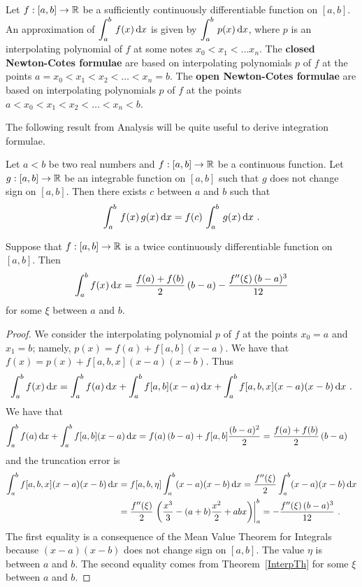 Let $f:[a,b]\rightarrow \mathbb{R}$ be a sufficiently continuously
differentiable function on $[a,b]$.  An approximation of
$\displaystyle \int_a^b\,f(x) \,\mathrm{d}x$ is given by
$\displaystyle \int_a^b\,p(x) \,\mathrm{d}x$,
where $p$ is an interpolating polynomial of $f$ at some notes
$x_0 < x_1 < \ldots x_n$.
The
{\bfseries closed Newton-Cotes formulae} are based on 
interpolating polynomials $p$ of $f$ at the points
$a=x_0 < x_1 <  x_2 < \ldots < x_n=b$.
The
{\bfseries open Newton-Cotes formulae} are based on 
interpolating polynomials $p$ of $f$ at the points
$a < x_0 < x_1 < x_2 < \ldots < x_n < b$.

The following result from Analysis will be quite useful to derive
integration formulae.

\begin{theorem} \label{Th4}
Let $a<b$ be two real numbers and $f:[a,b] \rightarrow \mathbb{R}$ be a
continuous function.  Let $g:[a,b] \rightarrow \mathbb{R}$ be an integrable
function on $[a,b]$ such that $g$ does not change sign on $[a,b]$.
Then there exists $c$ between $a$ and $b$ such that
\[
\int_a^b\,f(x)\,g(x) \,\mathrm{d}x=f(c)\,\int_a^b\,g(x) \,\mathrm{d}x \ .
\]
\end{theorem}

\begin{theorem}
Suppose that $f:[a,b]\rightarrow \mathbb{R}$ is a twice continuously
differentiable function on $[a,b]$.  Then
\[
\int_a^b f(x)\,\mathrm{d}x = \frac{f(a) + f(b)}{2}\left(b-a\right)
-\frac{f''(\xi)\,(b-a)^3}{12}
\]
for some $\xi$ between $a$ and $b$.
\end{theorem}

\begin{proof}
We consider the interpolating polynomial $p$ of $f$ at the points
$x_0=a$ and $x_1=b$; namely, $p(x) = f(a) + f[a,b](x-a)$.  We have that 
$f(x) = p(x)+f[a,b,x](x-a)(x-b)$.  Thus
\[
\int_a^b f(x) \dx{x} = \int_a^b f(a) \dx{x}
+ \int_a^b f[a,b](x-a)\dx{x} + \int_a^b f[a,b,x](x-a)(x-b)\dx{x} \ .
\]
We have that
\begin{align*}
\int_a^b f(a) \,\mathrm{d}x + \int_a^b f[a,b](x-a)\,\mathrm{d}x
&= f(a)\,(b-a) + f[a,b]\frac{(b-a)^2}{2}
= \frac{f(a) + f(b)}{2}\left(b-a\right)
\end{align*}
and the truncation error is
\begin{align*}
\int_a^b f[a,b,x](x-a)(x-b)\,\mathrm{d}x
&= f[a,b,\eta]\int_a^b (x-a)(x-b)\,\mathrm{d}x
= \frac{f''(\xi)}{2}\int_a^b (x-a)(x-b)\,\mathrm{d}x \\
&= \frac{f''(\xi)}{2}\left.\left(\frac{x^3}{3} - (a+b)\frac{x^2}{2} +
 abx\right)\right|_a^b
= -\frac{f''(\xi)\,(b-a)^3}{12}\ .
\end{align*}
The first equality is a consequence of the Mean Value Theorem
for Integrals because $(x-a)(x-b)$ does not change sign on $[a,b]$.
The value $\eta$ is between $a$ and $b$.  The second equality comes from
Theorem~\ref{InterpTh} for some $\xi$ between $a$ and $b$.
\end{proof}

